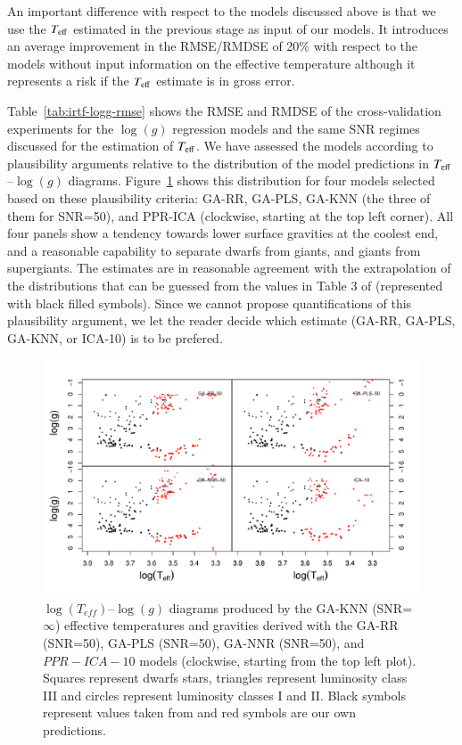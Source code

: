 An important difference with respect to the models discussed
above is that we use the $T_{\rm eff}$ estimated in the previous stage
as input of our models. It introduces an average improvement in the
RMSE/RMDSE of 20\% with respect to the models without input
information on the effective temperature although it represents a risk
if the $T_{\rm eff}$ estimate is in gross error.

Table~\ref{tab:irtf-logg-rmse} shows the RMSE and RMDSE of the
cross-validation experiments for the $\log(g)$ regression models and
the same SNR regimes discussed for the estimation of $T_{\rm eff}$. We
have assessed the models according to plausibility arguments relative
to the distribution of the model predictions in $T_{\rm
eff}$--$\log(g)$ diagrams.  Figure~\ref{fig:lt_lg_ga} shows this
distribution for four models selected based on these plausibility
criteria: GA-RR, GA-PLS, GA-KNN (the three of them for SNR=50), and
PPR-ICA (clockwise, starting at the top left corner). All four panels
show a tendency towards lower surface gravities at the coolest end,
and a reasonable capability to separate dwarfs from giants, and giants
from supergiants. The estimates are in reasonable agreement with the
extrapolation of the distributions that can be guessed from the values
in Table 3 of \cite{cesetti} (represented with black filled
symbols). Since we cannot propose quantifications of this plausibility
argument, we let the reader decide which estimate (GA-RR, GA-PLS,
GA-KNN, or ICA-10) is to be prefered.

\begin{figure}
 \begin{center}
   \includegraphics[width=\textwidth]{figs/ordieres-fig4.pdf}
\caption{$\log(T_{eff})$--$\log(g)$ diagrams produced by the GA-KNN
   (SNR=$\infty$) effective temperatures and gravities derived with
   the GA-RR (SNR=50), GA-PLS (SNR=50), GA-NNR (SNR=50), and
   $PPR-ICA-10$ models (clockwise, starting from the top left
   plot). Squares represent dwarfs stars, triangles represent
   luminosity class {\sc III} and circles represent luminosity classes
   {\sc I} and {\sc II}. Black symbols represent values taken
   from \cite{cesetti} and red symbols are our own predictions.}

\label{fig:lt_lg_ga}
 \end{center}
\end{figure}

